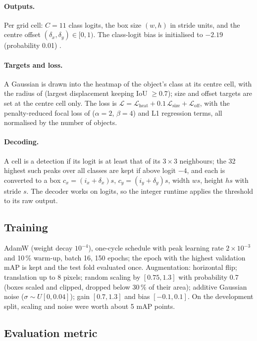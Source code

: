 \documentclass[11pt,a4paper]{article}
\begin{document}
\paragraph{Outputs.} Per grid cell: $C = 11$ class logits, the box size
$(w, h)$ in stride units, and the centre offset $(\delta_x, \delta_y) \in
[0,1)$. The class-logit bias is initialised to $-2.19$ (probability 0.01)
\cite{zhou2019}.

\paragraph{Targets and loss.} A Gaussian is drawn into the heatmap of the
object's class at its centre cell, with the radius of \cite{law2018} (largest
displacement keeping IoU $\ge 0.7$); size and offset targets are set at the
centre cell only. The loss is
$\mathcal{L} = \mathcal{L}_\text{heat} + 0.1\,\mathcal{L}_\text{size} +
\mathcal{L}_\text{off}$, with the penalty-reduced focal loss of
\cite{zhou2019} ($\alpha = 2$, $\beta = 4$) and L1 regression terms, all
normalised by the number of objects.

\paragraph{Decoding.} A cell is a detection if its logit is at least that of
its $3 \times 3$ neighbours; the 32 highest such peaks over all classes are
kept if above logit $-4$, and each is converted to a box
$c_x = (i_x + \delta_x)s$, $c_y = (i_y + \delta_y)s$, width $ws$, height
$hs$ with stride $s$. The decoder works on logits, so the integer runtime
applies the threshold to its raw output.

\subsection{Training}

AdamW (weight decay $10^{-4}$), one-cycle schedule with peak learning rate
$2 \times 10^{-3}$ and 10\,\% warm-up, batch 16, 150 epochs; the epoch with
the highest validation mAP is kept and the test fold evaluated once.
Augmentation: horizontal flip; translation up to 8 pixels; random scaling
by $[0.75, 1.3]$ with probability 0.7 (boxes scaled and clipped, dropped
below 30\,\% of their area); additive Gaussian noise ($\sigma \sim
U[0, 0.04]$); gain $[0.7, 1.3]$ and bias $[-0.1, 0.1]$. On the development
split, scaling and noise were worth about 5 mAP points.

\subsection{Evaluation metric}
\end{document}
